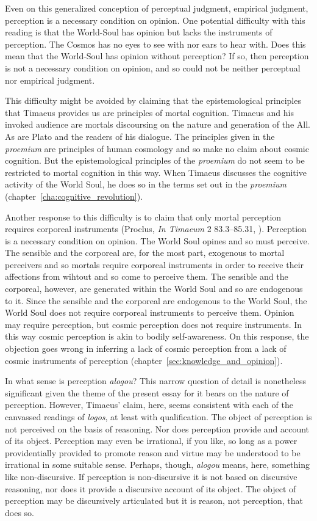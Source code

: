 Even on this generalized conception of perceptual judgment, empirical judgment, perception is a necessary condition on opinion. One potential difficulty with this reading is that the World-Soul has opinion but lacks the instruments of perception. The Cosmos has no eyes to see with nor ears to hear with. Does this mean that the World-Soul has opinion without perception? If so, then perception is not a necessary condition on opinion, and so could not be neither perceptual nor empirical judgment.

This difficulty might be avoided by claiming that the epistemological principles that Timaeus provides us are principles of mortal cognition. Timaeus and his invoked audience are mortals discoursing on the nature and generation of the All. As are Plato and the readers of his dialogue. The principles given in the \emph{proemium} are principles of human cosmology and so make no claim about cosmic cognition. But the epistemological principles of the \emph{proemium} do not seem to be restricted to mortal cognition in this way. When Timaeus discusses the cognitive activity of the World Soul, he does so in the terms set out in the \emph{proemium} (chapter~\ref{cha:cognitive_revolution}).

Another response to this difficulty is to claim that only mortal perception requires corporeal instruments (Proclus, \emph{In Timaeum} 2 83.3–85.31, \citealt{Diehl:1903re}). Perception is a necessary condition on opinion. The World Soul opines and so must perceive. The sensible and the corporeal are, for the most part, exogenous to mortal perceivers and so mortals require corporeal instruments in order to receive their affections from wihtout and so come to perceive them. The sensible and the corporeal, however, are generated within the World Soul and so are endogenous to it. Since the sensible and the corporeal are endogenous to the World Soul, the World Soul does not require corporeal instruments to perceive them. Opinion may require perception, but cosmic perception does not require instruments. In this way cosmic perception is akin to bodily self-awareness. On this response, the objection goes wrong in inferring a lack of cosmic perception from a lack of cosmic instruments of perception (chapter~\ref{sec:knowledge_and_opinion}).

In what sense is perception \emph{alogou}? This narrow question of detail is nonetheless significant given the theme of the present essay for it bears on the nature of perception. However, Timaeus' claim, here, seems consistent with each of the canvassed readings of \emph{logos}, at least with qualification. The object of perception is not perceived on the basis of reasoning. Nor does perception provide and account of its object. Perception may even be irrational, if you like, so long as a power providentially provided to promote reason and virtue may be understood to be irrational in some suitable sense. Perhaps, though, \emph{alogou} means, here, something like non-discursive. If perception is non-discursive it is not based on discursive reasoning, nor does it provide a discursive account of its object. The object of perception may be discursively articulated but it is reason, not perception, that does so.

